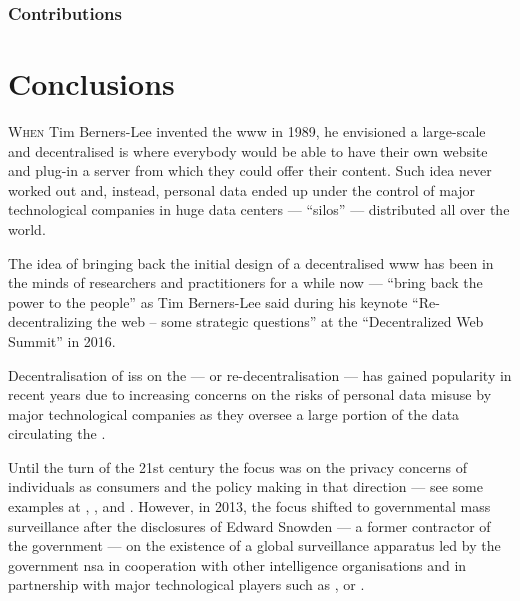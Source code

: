 \documentclass[showtrims,oldfontcommands]{kthesis}
\begin{document}
\subsection{Contributions}

\renewcommand\thesection{\thechapter.\arabic{section}}
\chapter{Conclusions}
    \label{chapter:conclusions}

\lettrine{\textcolor[gray]{.25}{W}}{hen} Tim Berners-Lee invented the \Ac{www} in 
1989, he envisioned a large-scale and decentralised \ac{is} where everybody would 
be able to have their own website and plug-in a server from which they could offer 
their content. Such idea never worked out and, instead, personal data ended up under 
the control of major technological companies in huge data centers --- ``silos'' 
--- distributed all over the world.

The idea of bringing back the initial design of a decentralised \ac{www} has been 
in the minds of researchers and practitioners for a while now --- ``bring back the 
power to the people'' as Tim Berners-Lee said during his keynote ``Re-decentralizing 
the web -- some strategic questions'' at the ``Decentralized Web Summit'' in 2016. 

Decentralisation of \acp{is} on the \Internet --- or re-decentralisation --- has 
gained popularity in recent years due to increasing concerns on the risks of personal 
data misuse by major technological companies as they oversee a large portion of 
the data circulating the \Internet.

Until the turn of the 21st century the focus was on the privacy concerns of individuals 
as consumers and the policy making in that direction --- see some examples at \cite{MilbergBSK95}, 
\cite{Rindfleisch97}, \cite{Clarke99} and \cite{NamSPI06}. However, in 2013, the 
focus shifted to governmental mass surveillance after the disclosures of Edward 
Snowden --- a former contractor of the  government --- on the existence 
of a global surveillance apparatus led by the  government \Ac{nsa} in cooperation 
with other intelligence organisations and in partnership with major technological 
players such as \Google, \Facebook or \Apple. 
\end{document}
